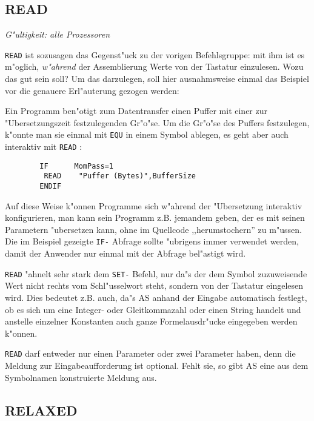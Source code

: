 \documentclass[12pt,a4paper,twoside]{report}
\makeatletter
\newcommand{\ii}[1]{{\it #1}}
\newcommand{\tty}[1]{{\tt #1}}
\newcommand{\ttindex}[1]{\index{#1@{\tt #1}}}
\makeatother
\begin{document}
{%

\subsection{READ}
\ttindex{READ}

{\em G"ultigkeit: alle Prozessoren}

\tty{READ} ist sozusagen das Gegenst"uck zu der vorigen Befehlsgruppe: mit
ihm ist es m"oglich, \ii{w"ahrend} der Assemblierung Werte von der
Tastatur einzulesen.  Wozu das gut sein soll?  Um das darzulegen, soll
hier ausnahmsweise einmal das Beispiel vor die genauere Erl"auterung
gezogen werden:
\par
Ein Programm ben"otigt zum Datentransfer einen Puffer mit einer zur
"Ubersetzungszeit festzulegenden Gr"o"se.  Um die Gr"o"se des Puffers
festzulegen, k"onnte man sie einmal mit \tty{EQU} in einem Symbol
ablegen, es geht aber auch interaktiv mit \tty{READ} :
\begin{verbatim}
        IF      MomPass=1
         READ    "Puffer (Bytes)",BufferSize
        ENDIF
\end{verbatim}
Auf diese Weise k"onnen Programme sich w"ahrend der "Ubersetzung
interaktiv konfigurieren, man kann sein Programm z.B. jemandem geben,
der es mit seinen Parametern "ubersetzen kann, ohne im Quellcode
,,herumstochern'' zu m"ussen.  Die im Beispiel gezeigte \tty{IF-}
Abfrage sollte "ubrigens immer verwendet werden, damit der Anwender
nur einmal mit der Abfrage bel"astigt wird.
\par
\tty{READ} "ahnelt sehr stark dem \tty{SET-} Befehl, nur da"s der
dem Symbol zuzuweisende Wert nicht rechts vom Schl"usselwort steht,
sondern von der Tastatur eingelesen wird.  Dies bedeutet z.B. auch,
da"s AS anhand der Eingabe automatisch festlegt, ob es sich um eine
Integer- oder Gleitkommazahl oder einen String handelt und anstelle
einzelner Konstanten auch ganze Formelausdr"ucke eingegeben werden
k"onnen.
\par
\tty{READ} darf entweder nur einen Parameter oder zwei Parameter
haben, denn die Meldung zur Eingabeaufforderung ist optional.  Fehlt
sie, so gibt AS eine aus dem Symbolnamen konstruierte Meldung aus.


\subsection{RELAXED}
\label{SectRELAXED}
\ttindex{RELAXED}

}
\end{document}
